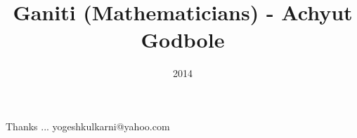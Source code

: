 \documentclass[xcolor=dvipsnames,compress,t,pdf]{beamer}
\title[Ganiti \hspace{4cm} \insertframenumber /\inserttotalframenumber]
{Ganiti (Mathematicians) - Achyut Godbole}
\subtitle[]{}
\date{2014}
\begin{document}
	\begin{frame}
	\titlepage
	\end{frame}
	
	
	
	\begin{frame}[c]{}
	Thanks ...
	\vspace{5mm}
	yogeshkulkarni@yahoo.com
	\end{frame}
\end{document}
